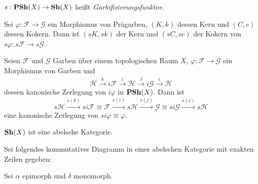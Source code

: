\documentclass{cheat-sheet}
\newcommand{\Fais}{\mathcal{F}} %
\newcommand{\Garb}{\mathcal{G}} %
\newcommand{\Karb}{\mathcal{H}} %
\newcommand{\Carb}{\mathcal{H}} %
\newcommand{\Iarb}{\mathcal{H}} %
\begin{document}
\begin{defn}
  $s : \mathbf{PSh}(X) \to \mathbf{Sh}(X)$ \enspace heißt \emph{Garbifizierungsfunktor}.
\end{defn}


\begin{lem}
  Sei $\varphi : \Fais \to \Garb$ ein Morphismus von Prägarben,
  $(K, k)$ dessen Kern und $(C, c)$ dessen Kokern.
  Dann ist $(sK, sk)$ der Kern und $(sC, sc)$ der Kokern von $s \varphi : s \Fais \to s \Garb$.
\end{lem}

\begin{prop}
  Seien $\Fais$ und $\Garb$ Garben über einem topologischen Raum $X$, $\varphi : \Fais \to \Garb$ ein Morphismus von Garben und
  \[ \Karb \xrightarrow{k} i \Fais \xrightarrow{i} \Iarb \xrightarrow{j} i \Garb \xrightarrow{c} \Carb \ \]
  dessen kanonische Zerlegung von $i \varphi$ in $\mathbf{PSh}(X)$. Dann ist
  \[ s \Karb \xrightarrow{s(k)} si \Fais \cong \Fais \xrightarrow{s(i)} s \Iarb \xrightarrow{s(j)} \Garb \cong si \Garb \xrightarrow{s(c)} s \Carb \ \]
  eine kanonische Zerlegung von $si \varphi \cong \varphi$.
\end{prop}

\begin{kor}
  $\mathbf{Sh}(X)$ ist eine abelsche Kategorie.
\end{kor}


\begin{lem}[Viererlemmata]
  Sei folgendes kommutatives Diagramm in einer abelschen Kategorie mit exakten Zeilen gegeben:
  \begin{center}
  \end{center}
  Sei $\alpha$ epimorph und $\delta$ monomorph.\\
   \enspace
\end{lem}
\end{document}
